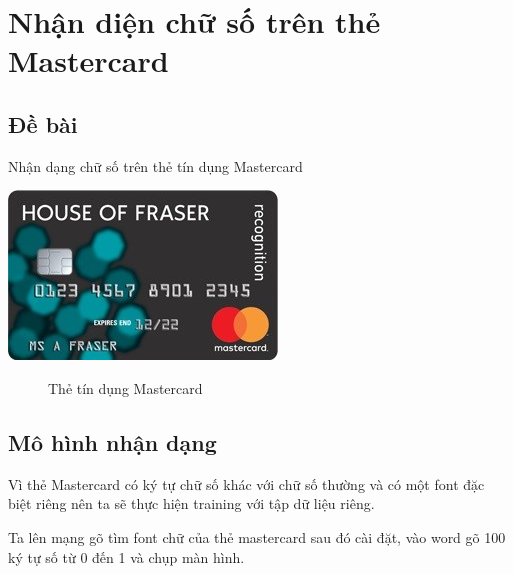 \section{Nhận diện chữ số trên thẻ Mastercard}

\subsection{Đề bài}
Nhận dạng chữ số trên thẻ tín dụng Mastercard
\begin{center}
    \includegraphics[scale = 1.2]{images/mastercard/inputMastercard}
\end{center}
\begin{figure}[h]
    \caption{Thẻ tín dụng Mastercard}
\end{figure}

\subsection{Mô hình nhận dạng}

    \quad Vì thẻ Mastercard có ký tự chữ số khác với chữ số thường và có một font đặc biệt riêng nên ta sẽ thực
hiện training với tập dữ liệu riêng.

    \quad Ta lên mạng gõ tìm font chữ của thẻ mastercard sau đó cài đặt, vào word
gõ 100 ký tự số từ 0 đến 1 và chụp màn hình. 

